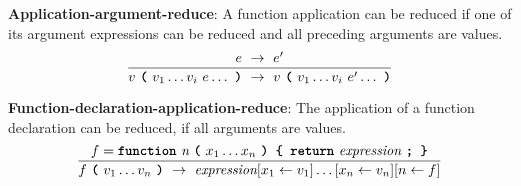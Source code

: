 \vspace{10mm}
\textbf{Application-argument-reduce}: A function application
can be reduced if one of its argument expressions can be reduced and all
preceding arguments are values.
\[
\frac{
  e \ \rightarrow \ e'
}{
  v\  \textbf{\texttt{(}}\ v_1 \ldots v_i \ e \ldots\ \textbf{\texttt{)}}
  \ \rightarrow \ 
  v\  \textbf{\texttt{(}}\ v_1 \ldots v_i \ e' \ldots\ \textbf{\texttt{)}}
}
\]



\vspace{10mm}
\textbf{Function-declaration-application-reduce}:
The application of a function declaration
can be reduced, if all
arguments are values. 
\[
\frac{
  f = \textbf{\texttt{function}}\  \textit{n} \ 
                 \textbf{\texttt{(}}\  x_1 \ldots x_n
                 \ \textbf{\texttt{)\ \{\ return}}\ \textit{expression}
                 \ \textbf{\texttt{;\ \}}}
}{
  f\ \textbf{\texttt{(}}\ v_1 \ldots v_n\ \textbf{\texttt{)}}
  \ \rightarrow \ 
  \textit{expression} [x_1 \leftarrow v_1]\ldots[x_n \leftarrow v_n]
  [n \leftarrow f]
}
\]


    
